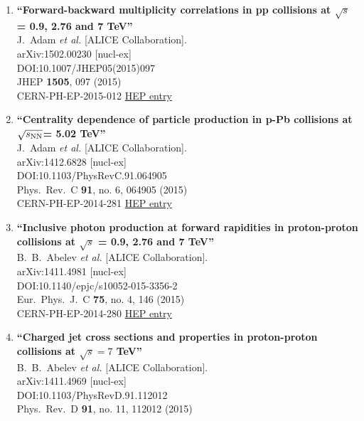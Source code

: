 \begin{enumerate}
\item%
{\bf ``Forward-backward multiplicity correlations in pp collisions at $ \sqrt{s} $ = 0.9, 2.76 and 7 TeV''}
  \\{}J.~Adam {\it et al.} [ALICE Collaboration].
  \\{}arXiv:1502.00230 [nucl-ex]
  \\{}DOI:10.1007/JHEP05(2015)097
  \\{}JHEP {\bf 1505}, 097 (2015)
  \\{}CERN-PH-EP-2015-012
\href{http://inspirehep.net/record/1342496}{HEP entry}
\item%
{\bf ``Centrality dependence of particle production in p-Pb collisions at $\sqrt{s_{\rm NN} }$= 5.02 TeV''}
  \\{}J.~Adam {\it et al.} [ALICE Collaboration].
  \\{}arXiv:1412.6828 [nucl-ex]
  \\{}DOI:10.1103/PhysRevC.91.064905
  \\{}Phys.\ Rev.\ C {\bf 91}, no. 6, 064905 (2015)
  \\{}CERN-PH-EP-2014-281
\href{http://inspirehep.net/record/1335350}{HEP entry}
\item%
{\bf ``Inclusive photon production at forward rapidities in proton-proton collisions at $\sqrt{s}$ = 0.9, 2.76 and 7 TeV''}
  \\{}B.~B.~Abelev {\it et al.} [ALICE Collaboration].
  \\{}arXiv:1411.4981 [nucl-ex]
  \\{}DOI:10.1140/epjc/s10052-015-3356-2
  \\{}Eur.\ Phys.\ J.\ C {\bf 75}, no. 4, 146 (2015)
  \\{}CERN-PH-EP-2014-280
\href{http://inspirehep.net/record/1328669}{HEP entry}
\item%
{\bf ``Charged jet cross sections and properties in proton-proton collisions at $\sqrt{s}=7$ TeV''}
  \\{}B.~B.~Abelev {\it et al.} [ALICE Collaboration].
  \\{}arXiv:1411.4969 [nucl-ex]
  \\{}DOI:10.1103/PhysRevD.91.112012
  \\{}Phys.\ Rev.\ D {\bf 91}, no. 11, 112012 (2015)

\end{enumerate}
